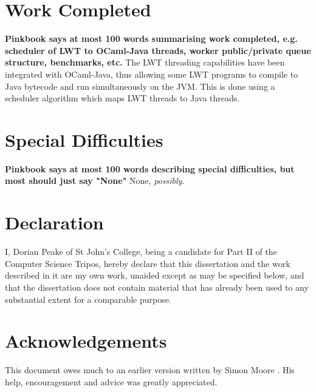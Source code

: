 \documentclass[12pt,twoside,notitlepage]{report}
\begin{document}
\section*{Work Completed}
{\bf Pinkbook says at most 100 words summarising work completed, e.g. scheduler of LWT to OCaml-Java threads, worker public/private queue structure, benchmarks, etc.}
The LWT threading capabilities have been integrated with OCaml-Java, thus allowing some LWT programs to compile to Java bytecode and run simultaneously on the JVM. This is done using a scheduler algorithm which maps LWT threads to
Java threads. 

\section*{Special Difficulties}
{\bf Pinkbook says at most 100 words describing special difficulties, but most should just say "None" }
None, {\em possibly}.

\newpage
\section*{Declaration}

I, Dorian Peake of St John's College, being a candidate for Part II of the Computer
Science Tripos, hereby declare
that this dissertation and the work described in it are my own work,
unaided except as may be specified below, and that the dissertation
does not contain material that has already been used to any substantial
extent for a comparable purpose.

\bigskip
{}

\medskip
{}

\cleardoublepage

\tableofcontents

\listoffigures

\newpage
\section*{Acknowledgements}
This document owes much to an earlier version written by Simon Moore
.  His help, encouragement and advice was greatly 
appreciated.


\cleardoublepage        %
\end{document}
